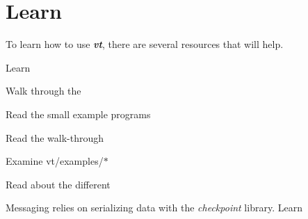 \chapter{Learn }
\hypertarget{learn}{}\label{learn}
To learn how to use {\bfseries{{\itshape vt}}}, there are several resources that will help.


\begin{DoxyItemize}
\item Learn 
\item Walk through the 
\item Read the small example programs
\begin{DoxyItemize}
\item Read the  walk-\/through
\item Examine {\ttfamily vt/\+examples/\+\texorpdfstring{$\ast$}{*}}
\end{DoxyItemize}
\item Read about the different 
\item Messaging relies on serializing data with the {\itshape checkpoint} library. Learn  
\end{DoxyItemize}


